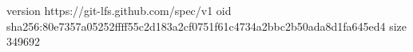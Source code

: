 version https://git-lfs.github.com/spec/v1
oid sha256:80e7357a05252ffff55c2d183a2cf0751f61c4734a2bbc2b50ada8d1fa645ed4
size 349692
